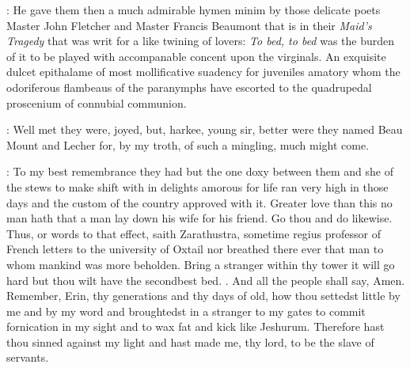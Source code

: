 \documentclass[12pt]{article}
\begin{document}
: He gave them then a much admirable hymen minim by those
delicate poets Master John Fletcher and Master Francis Beaumont that is
in their \emph{Maid's Tragedy} that was writ for a like twining of lovers:
\emph{To bed, to bed} was the burden of it to be played with
accompanable concent upon the virginals.
An exquisite dulcet epithalame of most mollificative suadency for
juveniles amatory whom the odoriferous flambeaus of the paranymphs have
escorted to the quadrupedal proscenium of connubial communion.

\Dx: Well met they were, joyed, but, harkee,
young sir, better were they named Beau Mount and Lecher for, by my troth,
of such a mingling, much might come.

\SD: To my best remembrance they had but the one doxy between them and she
of the stews to make shift with in delights amorous for life ran very high
in those days and the custom of the country approved with it. Greater love
than this no man hath that a man lay down his wife for his friend. Go thou
and do likewise. Thus, or words to that effect, saith Zarathustra,
sometime regius professor of French letters to the university of Oxtail
nor breathed there ever that man to whom mankind was more beholden. Bring
a stranger within thy tower it will go hard but thou wilt have the
secondbest bed. . And all the people
shall say, Amen. Remember, Erin, thy generations and thy days of old, how
thou settedst little by me and by my word and broughtedst in a stranger to
my gates to commit fornication in my sight and to wax fat and kick like
Jeshurum. Therefore hast thou sinned against my light and hast made me,
thy lord, to be the slave of servants.
\end{document}

